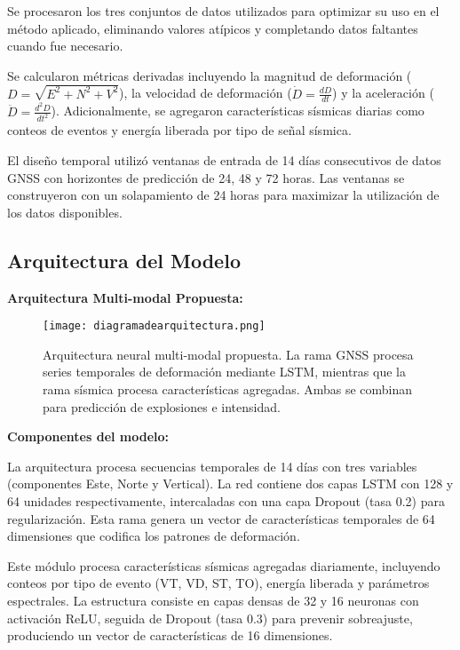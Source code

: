 \documentclass[11pt,a4paper]{article}
\begin{document}
Se procesaron los tres conjuntos de datos utilizados para optimizar su uso en el método aplicado, eliminando valores atípicos y completando datos faltantes cuando fue necesario.

Se calcularon métricas derivadas incluyendo la magnitud de deformación ($D = \sqrt{E^2 + N^2 + V^2}$), la velocidad de deformación ($\dot{D} = \frac{dD}{dt}$) y la aceleración ($\ddot{D} = \frac{d^2D}{dt^2}$). Adicionalmente, se agregaron características sísmicas diarias como conteos de eventos y energía liberada por tipo de señal sísmica.

El diseño temporal utilizó ventanas de entrada de 14 días consecutivos de datos GNSS con horizontes de predicción de 24, 48 y 72 horas. Las ventanas se construyeron con un solapamiento de 24 horas para maximizar la utilización de los datos disponibles.

\subsection{Arquitectura del Modelo}

\textbf{Arquitectura Multi-modal Propuesta:}

\begin{figure}[H]
    \centering
    \texttt{[image: diagramadearquitectura.png]}
    \caption{Arquitectura neural multi-modal propuesta. La rama GNSS procesa series temporales de deformación mediante LSTM, mientras que la rama sísmica procesa características agregadas. Ambas se combinan para predicción de explosiones e intensidad.}
    \label{fig:arquitectura}
\end{figure}

\textbf{Componentes del modelo:}

La arquitectura procesa secuencias temporales de 14 días con tres variables (componentes Este, Norte y Vertical). La red contiene dos capas LSTM con 128 y 64 unidades respectivamente, intercaladas con una capa Dropout (tasa 0.2) para regularización. Esta rama genera un vector de características temporales de 64 dimensiones que codifica los patrones de deformación.

Este módulo procesa características sísmicas agregadas diariamente, incluyendo conteos por tipo de evento (VT, VD, ST, TO), energía liberada y parámetros espectrales. La estructura consiste en capas densas de 32 y 16 neuronas con activación ReLU, seguida de Dropout (tasa 0.3) para prevenir sobreajuste, produciendo un vector de características de 16 dimensiones.
\end{document}
